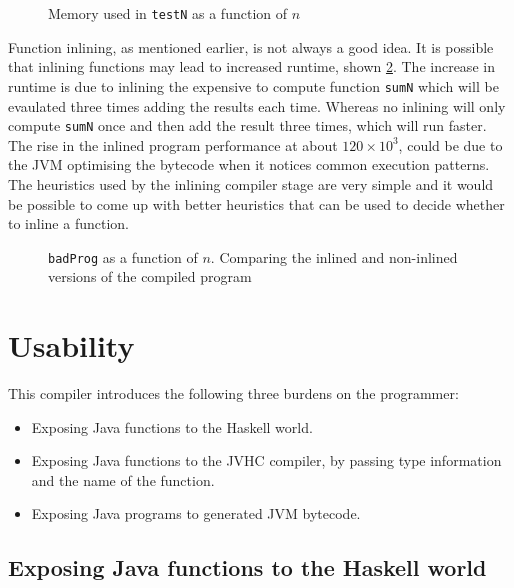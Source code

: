 \documentclass[float=false, crop=false]{standalone}
\newlength\gwidth
\newlength\gheight
\newcommand{\importMGraph}[3]{\setlength{\gwidth}{#2}\setlength{\gheight}{#3}{#1}}
\begin{document}
\begin{figure}
  \centering
  \importMGraph{memUsed}{0.96\textwidth}{0.3\textwidth}
  \caption{Memory used in \texttt{testN} as a function of $n$}
  \label{plot:memUsed}
\end{figure}
Function inlining, as mentioned earlier, is not always a good idea.
It is possible that inlining functions may lead to increased runtime, shown  
\cref{plot:badInline}. 
The increase in runtime is due to inlining the expensive to compute function 
\texttt{sumN} which will be evaulated three times adding the results each time. 
Whereas no inlining will only compute \texttt{sumN} once and then add the result three times, 
which will run faster. The rise in the inlined program performance at about $120 \times 10^3$, 
could be due to the JVM optimising the bytecode when it notices common execution patterns.
The heuristics used by the inlining compiler stage are very simple and it would be possible to 
come up with better heuristics that can be used to decide whether to inline a function.

\begin{figure}
  \centering
  \importMGraph{plotBadInline}{0.96\textwidth}{0.3\textwidth}
  \caption{\texttt{badProg} as a function of $n$. Comparing the inlined and non-inlined
  versions of the compiled program}
    \label{plot:badInline}
\end{figure}

\section{Usability}

This compiler introduces the following three burdens on the programmer:

\begin{itemize}
  \item Exposing Java functions to the Haskell world.

  \item Exposing Java functions to the JVHC compiler, by passing type information and the name 
    of the function.

  \item Exposing Java programs to generated JVM bytecode.
\end{itemize}

\subsection{Exposing Java functions to the Haskell world}
\end{document}
